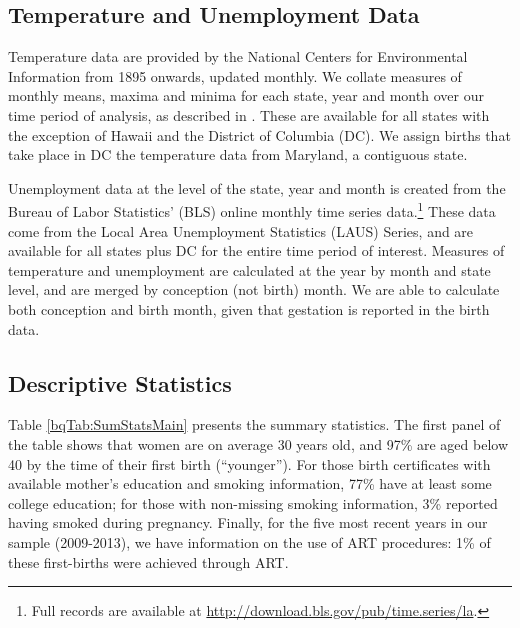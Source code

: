\documentclass[a4paper, 12 pt]{article}
\theoremstyle{plain}
\begin{document}
\begin{doublespace}
\subsection{Temperature and Unemployment Data}
Temperature data are provided by the National Centers for Environmental Information from 1895 onwards, updated monthly. We collate measures of monthly means, maxima and minima for each state, year and month over our time period of analysis, as described in \citet{Voseetal2014}. These are available for all states with the exception of Hawaii and the District of Columbia (DC). We assign births that take place in DC the temperature data from Maryland, a contiguous state.

Unemployment data at the level of the state, year and month is created from the Bureau of Labor Statistics' (BLS) online monthly time series
data.\footnote{Full records are available at \href{http://download.bls.gov/pub/time.series/la}{http://download.bls.gov/pub/time.series/la}.} These data come from the Local
Area Unemployment Statistics (LAUS) Series, and are available for all states plus DC for the entire time period of interest. Measures of temperature and unemployment are calculated at the year by month and state level, and are merged by conception (not birth) month.  We are able to calculate both conception and birth month, given that gestation is reported in the birth data.




\subsection{Descriptive Statistics}


Table \ref{bqTab:SumStatsMain} presents the summary statistics. The first panel of the table shows that women are on average 30 years old, and 97\% are aged below 40 by the time of their first birth (``younger''). For those birth certificates with available mother's education and smoking information, 77\% have at least some college education; for those with non-missing smoking information, 3\% reported having smoked during pregnancy. Finally, for the five most recent years in our sample (2009-2013), we have information on the use of ART procedures: 1\% of these first-births were achieved through ART.


\end{doublespace}
\end{document}
